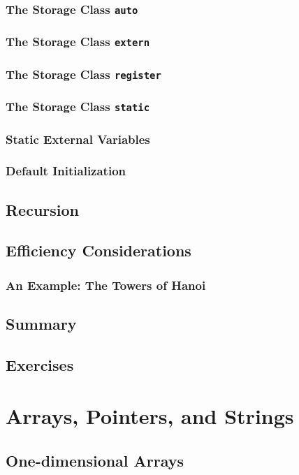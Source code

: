 \documentclass{article}
\begin{document}
\subsection{The Storage Class \texttt{auto}}
\subsection{The Storage Class \texttt{extern}}
\subsection{The Storage Class \texttt{register}}
\subsection{The Storage Class \texttt{static}}
\subsection{Static External Variables}
\subsection{Default Initialization}
\section{Recursion}
\section{Efficiency Considerations}
\subsection{An Example: The Towers of Hanoi}
\section{Summary}
\section{Exercises}

\chapter{Arrays, Pointers, and Strings}

\section{One-dimensional Arrays}
\end{document}
